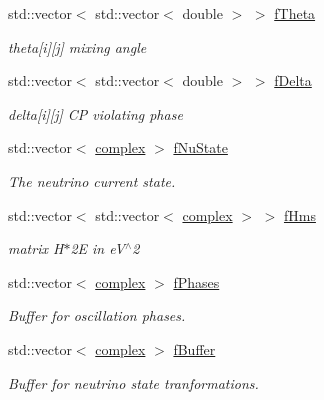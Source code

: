 \begin{DoxyCompactItemize}
std\+::vector$<$ std\+::vector$<$ double $>$ $>$ \hyperlink{classOscProb_1_1PMNS__Base_a1976887cd658dd86b2336c181f1470b4}{f\+Theta}
\begin{DoxyCompactList}\small\item\em theta\mbox{[}i\mbox{]}\mbox{[}j\mbox{]} mixing angle \end{DoxyCompactList}\item 
std\+::vector$<$ std\+::vector$<$ double $>$ $>$ \hyperlink{classOscProb_1_1PMNS__Base_ab2a5fa40e689b221c8a7d2c17213810d}{f\+Delta}
\begin{DoxyCompactList}\small\item\em delta\mbox{[}i\mbox{]}\mbox{[}j\mbox{]} CP violating phase \end{DoxyCompactList}\item 
std\+::vector$<$ \hyperlink{classOscProb_1_1PMNS__Base_ae86ec4718808ce9d02e5f5b4226714ab}{complex} $>$ \hyperlink{classOscProb_1_1PMNS__Base_ad38a7107c3ab393591fd5ba21658300b}{f\+Nu\+State}
\begin{DoxyCompactList}\small\item\em The neutrino current state. \end{DoxyCompactList}\item 
std\+::vector$<$ std\+::vector$<$ \hyperlink{classOscProb_1_1PMNS__Base_ae86ec4718808ce9d02e5f5b4226714ab}{complex} $>$ $>$ \hyperlink{classOscProb_1_1PMNS__Base_adf5901166216e8c7a5cff2092952f473}{f\+Hms}
\begin{DoxyCompactList}\small\item\em matrix H$\ast$2E in e\+V$^\wedge$2 \end{DoxyCompactList}\item 
std\+::vector$<$ \hyperlink{classOscProb_1_1PMNS__Base_ae86ec4718808ce9d02e5f5b4226714ab}{complex} $>$ \hyperlink{classOscProb_1_1PMNS__Base_a2fcb59d7c533e4cd963b1890e504d3dc}{f\+Phases}
\begin{DoxyCompactList}\small\item\em Buffer for oscillation phases. \end{DoxyCompactList}\item 
std\+::vector$<$ \hyperlink{classOscProb_1_1PMNS__Base_ae86ec4718808ce9d02e5f5b4226714ab}{complex} $>$ \hyperlink{classOscProb_1_1PMNS__Base_a53f912c6e4a17035a6c0c11fd63b5f14}{f\+Buffer}
\begin{DoxyCompactList}\small\item\em Buffer for neutrino state tranformations. \end{DoxyCompactList}\item 

\end{DoxyCompactItemize}
